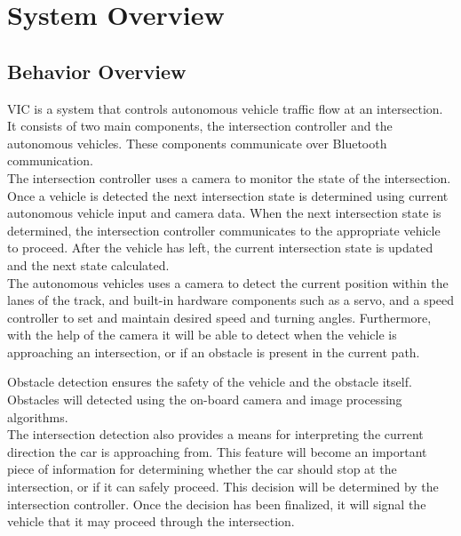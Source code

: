 \documentclass [10pt]{article}
\begin{document}




\section{System Overview}


\subsection{Behavior Overview}
     VIC is a system that controls autonomous vehicle traffic flow at an intersection. It consists of two main components, the intersection controller and the autonomous vehicles. These components communicate over Bluetooth communication. \\
      
     The intersection controller uses a camera to  monitor the state of the intersection. Once a vehicle is detected the next intersection state is determined using current autonomous vehicle input and camera data. When the next intersection state is determined, the intersection controller communicates to the appropriate vehicle to proceed. After the vehicle has left, the current intersection state is updated and the next state calculated.   \\


    The autonomous vehicles uses a camera to detect the current position within the lanes of the track, and built-in hardware components such as a servo, and a speed controller to set and maintain desired speed and turning angles. Furthermore, with the help of the camera it will be able to detect when the vehicle is approaching an intersection, or if an obstacle is present in the current path.
    
    
    Obstacle detection ensures the safety of the vehicle and the obstacle itself. Obstacles will detected using the on-board camera and image processing algorithms.  \\
    
    The intersection detection also provides a means for interpreting the current direction the car is approaching from. This feature  will become an important piece of information for determining whether the car should stop at the intersection, or if it can safely proceed. This decision will be determined by the intersection controller. Once the  decision has been finalized, it will signal the vehicle that it may proceed through the intersection.
    
\end{document}
